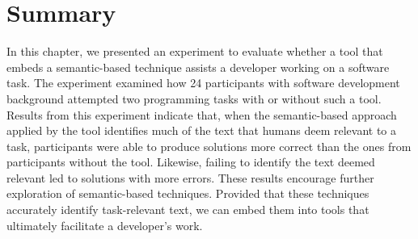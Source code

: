 \section{Summary}
\label{cp6:summary}



In this chapter, we presented an experiment to evaluate whether a tool that embeds a semantic-based technique assists a developer working on a software task. 
The experiment examined how 24 participants with software development background attempted 
two programming tasks with or without such a tool. 
Results from this experiment indicate that, when the semantic-based approach applied by the tool identifies much of the text that humans deem relevant to a task, participants were able to produce solutions more correct than the ones from participants without the tool.
Likewise, failing to identify the text deemed relevant led to solutions with more errors. 
These results encourage further exploration of semantic-based techniques.
Provided that these techniques accurately identify task-relevant text, we can embed them into tools that ultimately facilitate a developer's work.